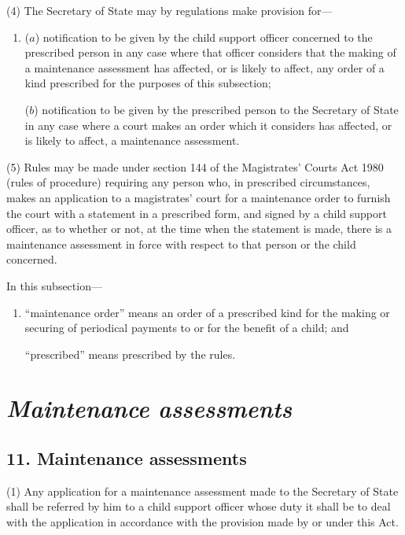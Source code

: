 \documentclass[12pt,a4paper]{article}
\begin{document}
(4) The Secretary of State may by regulations make provision for—
\begin{enumerate}\item[]
($a$) notification to be given by the child support officer concerned to the prescribed person in any case where that officer considers that the making of a maintenance assessment has affected, or is likely to affect, any order of a kind prescribed for the purposes of this subsection;

($b$) notification to be given by the prescribed person to the Secretary of State in any case where a court makes an order which it considers has affected, or is likely to affect, a maintenance assessment.
\end{enumerate}

(5) Rules may be made under section 144 of the Magistrates' Courts Act 1980 (rules of procedure) requiring any person who, in prescribed circumstances, makes an application to a magistrates' court for a maintenance order to furnish the court with a statement in a prescribed form, and signed by a child support officer, as to whether or not, at the time when the statement is made, there is a maintenance assessment in force with respect to that person or the child concerned.

In this subsection—
\begin{enumerate}\item[]
    “maintenance order” means an order of a prescribed kind for the making or securing of periodical payments to or for the benefit of a child; and

    “prescribed” means prescribed by the rules. 
\end{enumerate}


\section{\itshape Maintenance assessments}

\subsection{11. Maintenance assessments}

(1) Any application for a maintenance assessment made to the Secretary of State shall be referred by him to a child support officer whose duty it shall be to deal with the application in accordance with the provision made by or under this Act.
\end{document}
